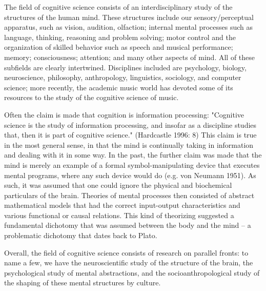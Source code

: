 \documentclass[12pt]{article}
\begin{document}
The field of cognitive science consists of an interdisciplinary study of the structures of the human mind. These structures include our sensory/perceptual apparatus, such as vision, audition, olfaction; internal mental processes such as language, thinking, reasoning and problem solving; motor control and the organization of skilled behavior such as speech and musical performance; memory; consciousness; attention; and many other aspects of mind. All of these subfields are clearly intertwined. Disciplines included are psychology, biology, neuroscience, philosophy, anthropology, linguistics, sociology, and computer science; more recently, the academic music world has devoted some of its resources to the study of the cognitive science of music.

Often the claim is made that cognition is information processing: "Cognitive science is the study of information processing, and insofar as a discipline studies that, then it is part of cognitive science." (Hardcastle 1996: 8) This claim is true in the most general sense, in that the mind is continually taking in information and dealing with it in some way. In the past, the further claim was made that the mind is merely an example of a formal symbol-manipulating device that executes mental programs, where any such device would do (e.g. von Neumann 1951). As such, it was assumed that one could ignore the physical and biochemical particulars of the brain. Theories of mental processes then consisted of abstract mathematical models that had the correct input-output characteristics and various functional or causal relations. This kind of theorizing suggested a fundamental dichotomy that was assumed between the body and the mind -- a problematic dichotomy that dates back to Plato.

Overall, the field of cognitive science consists of research on parallel fronts: to name a few, we have the neuroscientific study of the structure of the brain, the psychological study of mental abstractions, and the socioanthropological study of the shaping of these mental structures by culture.
\end{document}

